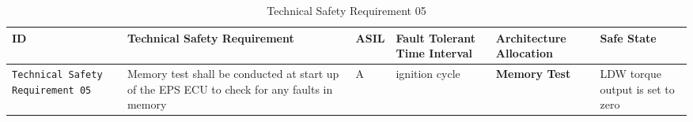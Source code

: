 \begin{table}[!htpb]
\caption{Technical Safety Requirement 05}
\begin{center}
\scriptsize
\renewcommand{\arraystretch}{1.4}
\begin{tabular}{ L{1.8cm}|L{5.2cm}|L{0.7cm}|L{1.3cm}|L{1.8cm}|L{2.0cm}  }
\hline
{}
ID &
Technical Safety Requirement  &
ASIL &
Fault Tolerant Time Interval  &  
Architecture Allocation  &  
Safe State \\\hline
\textcolor{harmonia-blue}{\texttt{Technical Safety Requirement 05}}  &
Memory test shall be conducted at start up of the EPS ECU to check for any
  faults in memory
  &
A &
ignition cycle  &
  \textbf{Memory Test} &
LDW torque output is set to zero
\\\hline
\end{tabular}
\end{center}
\label{tab:tr05}
\end{table}


